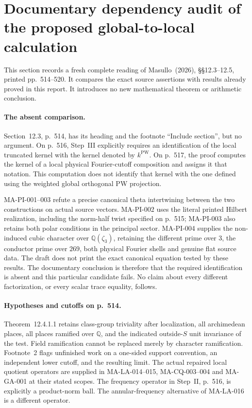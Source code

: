 \section{Documentary dependency audit of the proposed global-to-local calculation}
\label{sec:source-dependency-audit}

This section records a fresh complete reading of Masullo~(2026),
\S\S12.3--12.5, printed pp.~514--520.  It compares the exact
source assertions with results already proved in this report.
It introduces no new mathematical theorem or arithmetic conclusion.

\paragraph{The absent comparison.}
Section~12.3, p.~514, has its heading and the footnote
``Include section'', but no argument.  On p.~516, Step~III
explicitly requires an identification of the local truncated
kernel with the kernel denoted by $k^{\mathrm{PW}}$.
On p.~517, the proof computes the kernel of a local physical
Fourier-cutoff composition and assigns it that notation.
This computation does not identify that kernel with the one
defined using the weighted global orthogonal PW projection.

MA-PI-001--003 refute a precise canonical theta intertwining
between the two constructions on actual source vectors.
MA-PI-002 uses the literal printed Hilbert realization,
including the norm-half twist specified on p.~515;
MA-PI-003 also retains both polar conditions in the principal
sector.  MA-PI-004 supplies the non-induced cubic character
over $\mathbb Q(\zeta_3)$, retaining the different prime over
$3$, the conductor prime over $269$, both physical Fourier
shells and genuine flat source data.
The draft does not print the exact canonical equation
tested by these results.  The documentary conclusion is therefore
that the required identification is absent and this particular
candidate fails.  No claim about every different factorization,
or every scalar trace equality, follows.

\paragraph{Hypotheses and cutoffs on p.~514.}
Theorem~12.4.1.1 retains class-group triviality after localization,
all archimedean places, all places ramified over $\mathbb Q$,
and the indicated outside-$S$ unit invariance of the test.
Field ramification cannot be replaced merely by character
ramification.  Footnote~2 flags unfinished work on a one-sided
support convention, an independent lower cutoff, and the resulting
limit.  The actual repaired local quotient operators are supplied
in MA-LA-014--015, MA-CQ-003--004 and MA-GA-001 at their stated
scopes.  The frequency operator in Step~II, p.~516, is explicitly
a product-norm ball.  The annular-frequency alternative of
MA-LA-016 is a different operator.

